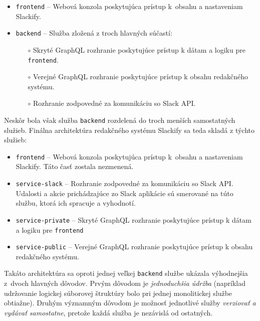 \begin{itemize}
	\item \texttt{frontend} -- Webová konzola poskytujúca prístup k~obsahu a nastaveniam Slackify.
	\item \texttt{backend} -- Služba zložená z troch hlavných súčastí:
		\begin{itemize}
			\item[$\circ$] Skryté GraphQL rozhranie poskytujúce prístup k dátam a logiku pre \texttt{frontend}.
			\item[$\circ$] Verejné GraphQL rozhranie poskytujúce prístup k obsahu redakčného systému.
			\item[$\circ$] Rozhranie zodpovedné za komunikáciu so Slack API.
		\end{itemize}
\end{itemize}

\noindent Neskôr bola však služba \texttt{backend} rozdelená do troch menších samostatných služieb. Finálna architektúra redakčného systému Slackify sa teda skladá z týchto služieb:

\begin{itemize}
	\item \texttt{frontend} -- Webová konzola poskytujúca prístup k~obsahu a nastaveniam Slackify. Táto časť zostala nezmenená.
	\item \texttt{service-slack} -- Rozhranie zodpovedné za komunikáciu so Slack API. Udalosti a akcie prichádzajúce zo Slack aplikácie sú smerované na túto službu, ktorá ich spracuje a vyhodnotí.
	\item \texttt{service-private} -- Skryté GraphQL rozhranie poskytujúce prístup k dátam a logiku pre \texttt{frontend}
	\item \texttt{service-public} -- Verejné GraphQL rozhranie poskytujúce prístup k obsahu redakčného systému.
\end{itemize}

\noindent Takáto architektúra sa oproti jednej veľkej \texttt{backend} službe ukázala výhodnejšia z~dvoch hlavných dôvodov. Prvým dôvodom je \emph{jednoduchšia údržba} (napríklad udržovanie logickej súborovej štruktúry bolo pri jednej monolitickej službe obtiažne). Druhým významným dôvodom je možnosť jednotlivé služby \emph{verziovať a vydávať samostatne}, pretože každá služba je nezávislá od ostatných.

